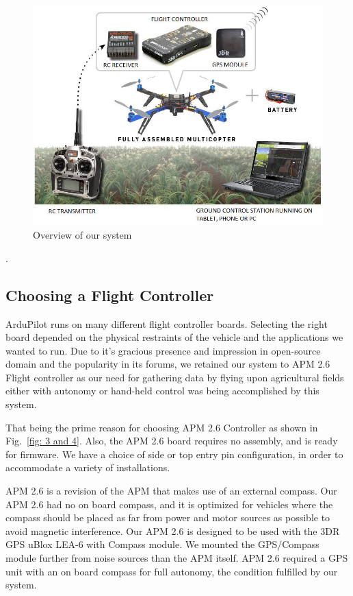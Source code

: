 \begin{figure}[h]
	\includegraphics[width=0.9\linewidth]{img_1}
	\centering
	\caption{\label{fig: img_1}Overview of our system}
\end{figure}.

\subsection{Choosing a Flight Controller}
ArduPilot runs on many different flight controller boards. Selecting the right board depended on the physical restraints of the vehicle and the applications we wanted to run. Due to it's gracious presence and impression in open-source domain and the popularity in its forums, we retained our system to APM 2.6 Flight controller as our need for gathering data by flying upon agricultural fields either with autonomy or hand-held control was being accomplished by this system.


That being the prime reason for choosing APM 2.6 Controller as shown in Fig.~\ref{fig: 3 and 4}. Also, the APM 2.6 board requires no assembly, and is ready for firmware. We have a choice of side or top entry pin configuration, in order to accommodate a variety of installations. 

APM 2.6 is a revision of the APM that makes use of an external compass. Our APM 2.6 had no on board compass, and it is optimized for vehicles where the compass should be placed as far from power and motor sources as possible to avoid magnetic interference. Our APM 2.6 is designed to be used with the 3DR GPS uBlox LEA-6 with Compass module. We mounted the GPS/Compass module further from noise sources than the APM itself. APM 2.6 required a GPS unit with an on board compass for full autonomy, the condition fulfilled by our system.

